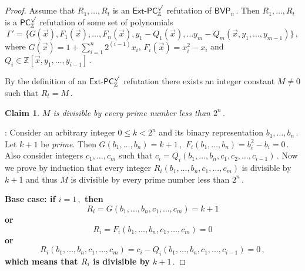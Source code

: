 \documentclass[11pt]{article}
\newtheorem{claim}[theorem]{Claim}
\newcommand{\Z}{{\mathbb Z}}
\begin{document}
\begin{proof}


Assume that %
$R_1, \ldots, R_t$ %
 is an $\mathsf{Ext}$-$\mathsf{PC}^{\surd}_{\Z}$ refutation of %
$\mathsf{BVP}_n\,.$ %
 Then %
$R_1, \ldots, R_t$ %
 is a $\mathsf{PC}_{\Z}^{\surd}$ refutation of some set of polynomials
$$
%
\Gamma' = \{G(\vec x), F_1(\vec x), \ldots, F_n(\vec x), y_1 - Q_1(\vec x), \ldots y_m - Q_m(\vec x, y_1, \ldots, y_{m - 1})\}\,, %
$$
where
%
 $G(\vec x) = 1 + \sum_{i = 1}^n    %
 2^{(i - 1)} x_i$, $F_i(\vec x) = x_i^2 - x_i$ and %
$Q_i \in \Z[\vec x, y_1, \ldots, y_{i - 1}]\,.$ %

By the definition of an $\mathsf{Ext}$-$\mathsf{PC}^{\surd}_{\Z}$ refutation there exists an integer constant $M \neq 0$ such that %
$R_t = M\,.$ %

\begin{claim}\label{cla:M-div-every-prime}
$M$ is divisible by every prime number less than %
$2^n\,.$ %
\end{claim}
\par{}:
Consider an arbitrary integer %
%
$0 \le k < 2^n$ and its binary representation %
$b_{1}, \ldots, b_{n}\,.$ %
 Let $k + 1$ be \emph{prime}. Then %
$G(b_1, \ldots, b_n) = k + 1\,,$ %
$F_i(b_1, \ldots, b_n) = b_i^2 - b_i = 0\,.$ %
 Also consider integers $c_1, \ldots, c_m$ such that %
$c_i = Q_i(b_1, \ldots, b_n, c_1, c_2, \ldots, c_{i - 1})\,.$ %
 Now we prove by induction that every integer %
$R_i(b_1, \ldots, b_n, c_1, \ldots, c_m)$ is divisible by $k + 1$ and thus $M$ is divisible by every prime number less than %
$2^n\,.$ %

\bfseries Base case: \mdseries if %
$i = 1\,,$ %
 then
$$
R_i = G(b_1, \ldots, b_n, c_1, \ldots, c_m) = k + 1
$$ or 
$$
R_i = F_i(b_1, \ldots, b_n, c_1, \ldots, c_m) = 0
$$ or 
$$
%
R_i(b_1, \ldots, b_n, c_1, \ldots, c_m) = c_i - Q_i(b_1, \ldots, b_n, c_1, \ldots, c_{i - 1}) = 0\,, %
$$
which means that $R_i$ is divisible by %
$k + 1\,.$ %


\end{proof}
\end{document}
